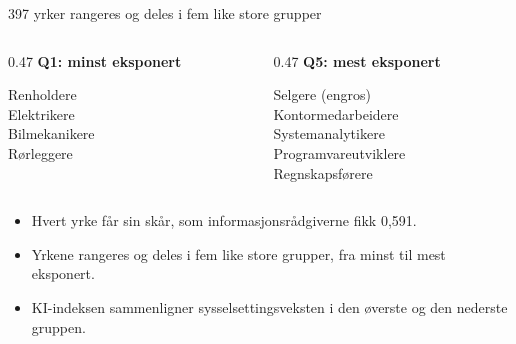\begin{frame}{397 yrker rangeres og deles i fem like store grupper}
\begin{columns}[T,onlytextwidth]
\begin{column}{0.47\textwidth}
{\small\bfseries\textcolor{illGray}{Q1: minst eksponert}}

\vspace{0.4em}
\small
Renholdere \\ Elektrikere \\ Bilmekanikere \\ Rørleggere
\end{column}
\begin{column}{0.47\textwidth}
{\small\bfseries\textcolor{illBlue}{Q5: mest eksponert}}

\vspace{0.4em}
\small
Selgere (engros) \\ Kontormedarbeidere \\ Systemanalytikere \\ Programvareutviklere \\ Regnskapsførere
\end{column}
\end{columns}

\vspace{1.0em}
\begin{itemize}\setlength{\itemsep}{4pt}
  \item Hvert yrke får sin skår, som informasjonsrådgiverne fikk 0,591.
  \item Yrkene rangeres og deles i fem like store grupper, fra minst til mest eksponert.
  \item KI-indeksen sammenligner sysselsettingsveksten i den øverste og den nederste gruppen.
\end{itemize}
\end{frame}
